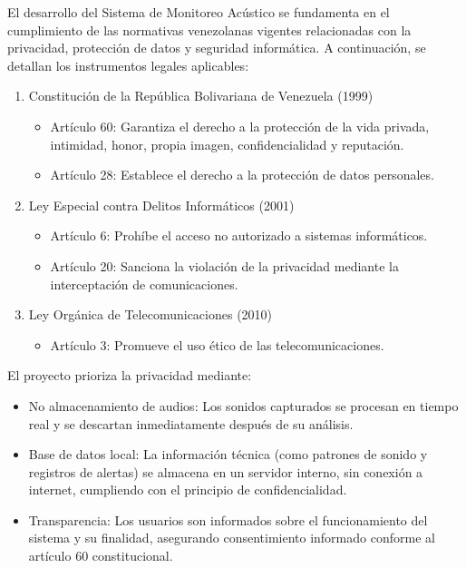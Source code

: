 
El desarrollo del Sistema de Monitoreo Acústico se fundamenta en el cumplimiento de las normativas venezolanas vigentes relacionadas con la privacidad, protección de datos y seguridad informática. A continuación, se detallan los instrumentos legales aplicables:

\begin{enumerate}
  \item Constitución de la República Bolivariana de Venezuela (1999)
        \begin{itemize}
          \item Artículo 60: Garantiza el derecho a la protección de la vida privada, intimidad, honor, propia imagen, confidencialidad y reputación.  
          \item Artículo 28: Establece el derecho a la protección de datos personales.
        \end{itemize}
  \item Ley Especial contra Delitos Informáticos (2001)
        \begin{itemize}
          \item Artículo 6: Prohíbe el acceso no autorizado a sistemas informáticos.
          \item Artículo 20: Sanciona la violación de la privacidad mediante la interceptación de comunicaciones.
        \end{itemize}
  \item Ley Orgánica de Telecomunicaciones (2010)
        \begin{itemize}
          \item Artículo 3: Promueve el uso ético de las telecomunicaciones.
        \end{itemize}
\end{enumerate}

El proyecto prioriza la privacidad mediante:
\begin{itemize}
  \item No almacenamiento de audios: Los sonidos capturados se procesan en tiempo real y se descartan inmediatamente después de su análisis.
  \item Base de datos local: La información técnica (como patrones de sonido y registros de alertas) se almacena en un servidor interno, sin conexión a internet, cumpliendo con el principio de confidencialidad.
  \item Transparencia: Los usuarios son informados sobre el funcionamiento del sistema y su finalidad, asegurando consentimiento informado conforme al artículo 60 constitucional.
\end{itemize}
